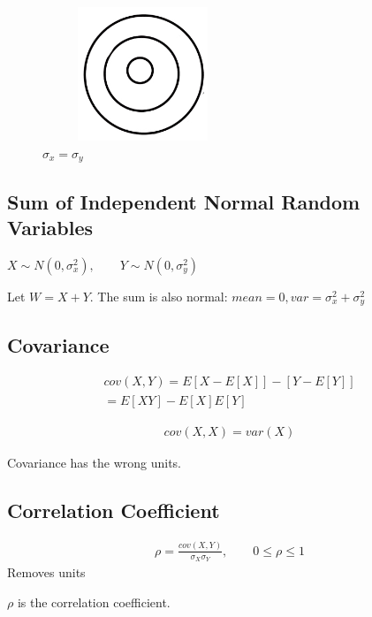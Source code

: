 \begin{figure}[h]
\centering
\includegraphics[width=6cm, height=4cm]{images/L11/percent_circle.jpeg}
\caption{$\sigma_x = \sigma_y$}
\end{figure}

\subsection{Sum of Independent Normal Random Variables}


$X \sim N(0, \sigma_x^2), \qquad Y \sim N(0, \sigma_y^2)$

Let $W=X+Y$.  The sum is also normal: $mean=0,var=\sigma_x^2 + \sigma_y^2$

\subsection{Covariance}


\begin{align*}
    cov(X,Y)=E[X-E[X]] - [Y - E[Y]] \\
    = E[XY] - E[X]E[Y]
\end{align*}

\begin{align*}
cov(X,X)=var(X)
\end{align*}

Covariance has the wrong units.

\subsection{Correlation Coefficient}


\begin{align*}
\rho = \frac{cov(X,Y)}{\sigma_X \sigma_Y}, \qquad 0 \le \rho \le 1
\end{align*}
Removes units

$\rho$ is the correlation coefficient.